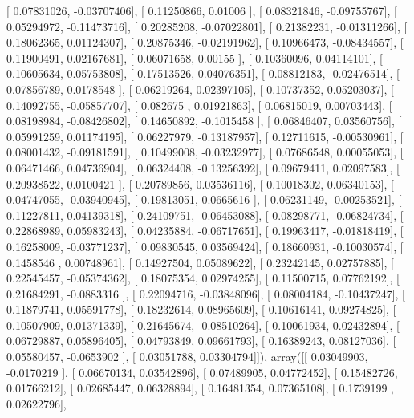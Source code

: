 \documentclass{article}
\begin{document}
       [ 0.07831026, -0.03707406],
       [ 0.11250866,  0.01006   ],
       [ 0.08321846, -0.09755767],
       [ 0.05294972, -0.11473716],
       [ 0.20285208, -0.07022801],
       [ 0.21382231, -0.01311266],
       [ 0.18062365,  0.01124307],
       [ 0.20875346, -0.02191962],
       [ 0.10966473, -0.08434557],
       [ 0.11900491,  0.02167681],
       [ 0.06071658,  0.00155   ],
       [ 0.10360096,  0.04114101],
       [ 0.10605634,  0.05753808],
       [ 0.17513526,  0.04076351],
       [ 0.08812183, -0.02476514],
       [ 0.07856789,  0.0178548 ],
       [ 0.06219264,  0.02397105],
       [ 0.10737352,  0.05203037],
       [ 0.14092755, -0.05857707],
       [ 0.082675  ,  0.01921863],
       [ 0.06815019,  0.00703443],
       [ 0.08198984, -0.08426802],
       [ 0.14650892, -0.1015458 ],
       [ 0.06846407,  0.03560756],
       [ 0.05991259,  0.01174195],
       [ 0.06227979, -0.13187957],
       [ 0.12711615, -0.00530961],
       [ 0.08001432, -0.09181591],
       [ 0.10499008, -0.03232977],
       [ 0.07686548,  0.00055053],
       [ 0.06471466,  0.04736904],
       [ 0.06324408, -0.13256392],
       [ 0.09679411,  0.02097583],
       [ 0.20938522,  0.0100421 ],
       [ 0.20789856,  0.03536116],
       [ 0.10018302,  0.06340153],
       [ 0.04747055, -0.03940945],
       [ 0.19813051,  0.0665616 ],
       [ 0.06231149, -0.00253521],
       [ 0.11227811,  0.04139318],
       [ 0.24109751, -0.06453088],
       [ 0.08298771, -0.06824734],
       [ 0.22868989,  0.05983243],
       [ 0.04235884, -0.06717651],
       [ 0.19963417, -0.01818419],
       [ 0.16258009, -0.03771237],
       [ 0.09830545,  0.03569424],
       [ 0.18660931, -0.10030574],
       [ 0.1458546 ,  0.00748961],
       [ 0.14927504,  0.05089622],
       [ 0.23242145,  0.02757885],
       [ 0.22545457, -0.05374362],
       [ 0.18075354,  0.02974255],
       [ 0.11500715,  0.07762192],
       [ 0.21684291, -0.0883316 ],
       [ 0.22094716, -0.03848096],
       [ 0.08004184, -0.10437247],
       [ 0.11879741,  0.05591778],
       [ 0.18232614,  0.08965609],
       [ 0.10616141,  0.09274825],
       [ 0.10507909,  0.01371339],
       [ 0.21645674, -0.08510264],
       [ 0.10061934,  0.02432894],
       [ 0.06729887,  0.05896405],
       [ 0.04793849,  0.09661793],
       [ 0.16389243,  0.08127036],
       [ 0.05580457, -0.0653902 ],
       [ 0.03051788,  0.03304794]]), array([[ 0.03049903, -0.0170219 ],
       [ 0.06670134,  0.03542896],
       [ 0.07489905,  0.04772452],
       [ 0.15482726,  0.01766212],
       [ 0.02685447,  0.06328894],
       [ 0.16481354,  0.07365108],
       [ 0.1739199 ,  0.02622796],
\end{document}
